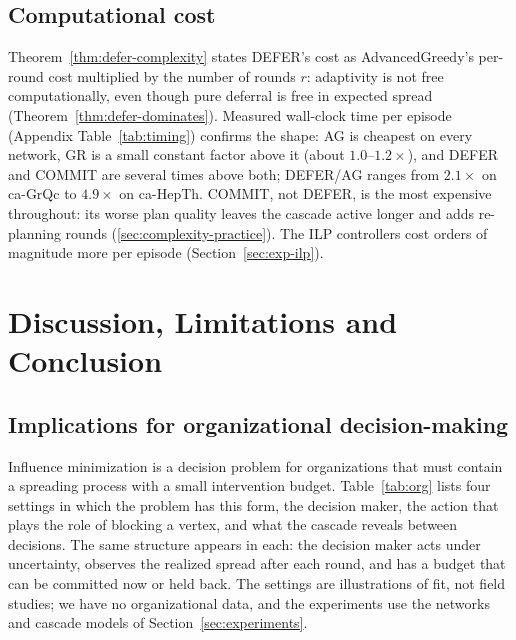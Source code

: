 \documentclass[preprint,11pt]{elsarticle}
\theoremstyle{definition}
\theoremstyle{remark}
\begin{document}
\subsection{Computational cost}\label{sec:complexity-comparison}

Theorem~\ref{thm:defer-complexity} states DEFER's cost as AdvancedGreedy's per-round cost multiplied by the number of rounds $r$: adaptivity is not free computationally, even though pure deferral is free in expected spread (Theorem~\ref{thm:defer-dominates}). Measured wall-clock time per episode (Appendix Table~\ref{tab:timing}) confirms the shape: AG is cheapest on every network, GR is a small constant factor above it (about $1.0$--$1.2\times$), and DEFER and COMMIT are several times above both; DEFER/AG ranges from $2.1\times$ on ca-GrQc to $4.9\times$ on ca-HepTh. COMMIT, not DEFER, is the most expensive throughout: its worse plan quality leaves the cascade active longer and adds re-planning rounds (\ref{sec:complexity-practice}). The ILP controllers cost orders of magnitude more per episode (Section~\ref{sec:exp-ilp}).

\section{Discussion, Limitations and Conclusion}\label{sec:discussion}
\subsection{Implications for organizational decision-making}\label{sec:org}

Influence minimization is a decision problem for organizations that must contain a spreading process with a small intervention budget. Table~\ref{tab:org} lists four settings in which the problem has this form, the decision maker, the action that plays the role of blocking a vertex, and what the cascade reveals between decisions. The same structure appears in each: the decision maker acts under uncertainty, observes the realized spread after each round, and has a budget that can be committed now or held back. The settings are illustrations of fit, not field studies; we have no organizational data, and the experiments use the networks and cascade models of Section~\ref{sec:experiments}.
\end{document}
